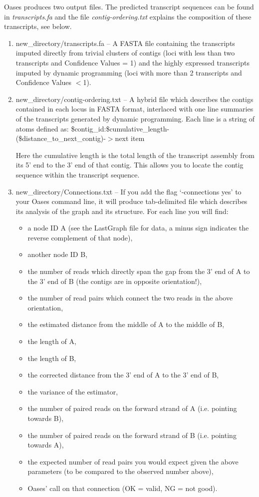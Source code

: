 \documentclass[12pt]{article}
\begin{document}
Oases produces two output files. The predicted transcript sequences can be found in \emph{transcripts.fa} and the file \emph{contig-ordering.txt} explains the composition of these transcripts, see below.
\begin{enumerate}
\item new\_directory/transcripts.fa --
	A FASTA file containing the transcripts imputed directly from trivial
	clusters of contigs (loci with less than two transcripts and Confidence Values = 1)
	and the highly expressed transcripts imputed by dynamic
	programming (loci with more than 2 transcripts and Confidence Values $<$1).
   
\item 
new\_directory/contig-ordering.txt --
	A hybrid file which describes the contigs contained in each locus in FASTA
	format, interlaced with one line summaries of the transcripts generated by 
	dynamic programming. Each line is a string of atoms defined as:
	\$contig\_id:\$cumulative\_length-(\$distance\_to\_next\_contig)-$>$next item

	Here the cumulative length is the total length of the transcript assembly from
	its 5' end to the 3' end of that contig. This allows you to locate the contig
	sequence within the transcript sequence.
\item new\_directory/Connections.txt --
	If you add the flag `-connections yes' to your Oases command line, it will produce 
	tab-delimited file which describes its analysis of the graph and its structure. 
	For each line you will find:
\begin{itemize}
	\item a node ID A (see the LastGraph file for data, a minus sign indicates the reverse complement of that node),
	\item another node ID B,
	\item the number of reads which directly span the gap from the 3' end of A to the 3' end of B (the contigs are in opposite orientation!),
	\item the number of read pairs which connect the two reads in the above orientation,
	\item the estimated distance from the middle of A to the middle of B,
	\item the length of A,
	\item the length of B,
	\item the corrected distance from the 3' end of A to the 3' end of B,
	\item the variance of the estimator,
	\item the number of paired reads on the forward strand of A (i.e. pointing towards B),
	\item the number of paired reads on the forward strand of B (i.e. pointing towards A),
	\item the expected number of read pairs you would expect given the above parameters (to be compared to the observed number above),
	\item Oases' call on that connection (OK = valid, NG = not good).
\end{itemize}
\end{enumerate}	
\end{document}

